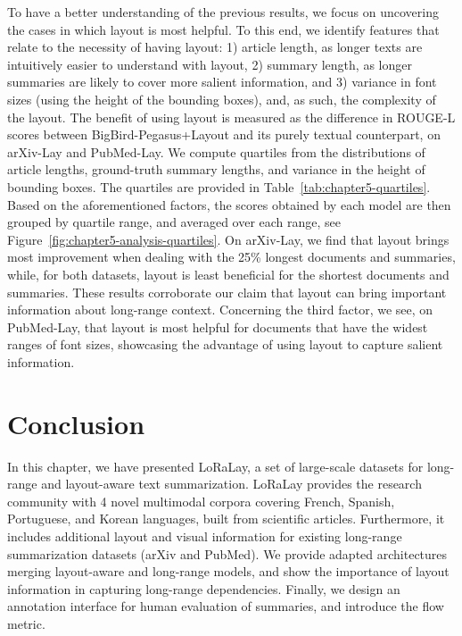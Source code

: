 To have a better understanding of the previous results, we focus on uncovering the cases in which layout is most helpful. To this end, we identify features that relate to the necessity of having layout: 1) article length, as longer texts are intuitively easier to understand with layout, 2) summary length, as longer summaries are likely to cover more salient information, and 3) variance in font sizes (using the height of the bounding boxes), and, as such, the complexity of the layout.
The benefit of using layout is measured as the difference in ROUGE-L scores between BigBird-Pegasus+Layout and its purely textual counterpart, on arXiv-Lay and PubMed-Lay. We compute quartiles from the distributions of article lengths, ground-truth summary lengths, and variance in the height of bounding boxes. The quartiles are provided in Table~\ref{tab:chapter5-quartiles}. Based on the aforementioned factors, the scores obtained by each model are then grouped by quartile range, and averaged over each range, see Figure~\ref{fig:chapter5-analysis-quartiles}. On arXiv-Lay, we find that layout brings most improvement when dealing with the 25\% longest documents and summaries, while, for both datasets, layout is least beneficial for the shortest documents and summaries. These results corroborate our claim that layout can bring important information about long-range context. Concerning the third factor, we see, on PubMed-Lay, that layout is most helpful for documents that have the widest ranges of font sizes, showcasing the advantage of using layout to capture salient information. 

\section{Conclusion}

In this chapter, we have presented LoRaLay, a set of large-scale datasets for long-range and layout-aware text summarization. LoRaLay provides the research community with 4 novel multimodal corpora covering French, Spanish, Portuguese, and Korean languages, built from scientific articles. Furthermore, it includes additional layout and visual information for existing long-range summarization datasets (arXiv and PubMed). We provide adapted architectures merging layout-aware and long-range models, and show the importance of layout information in capturing long-range dependencies. Finally, we design an annotation interface for human evaluation of summaries, and introduce the flow metric.